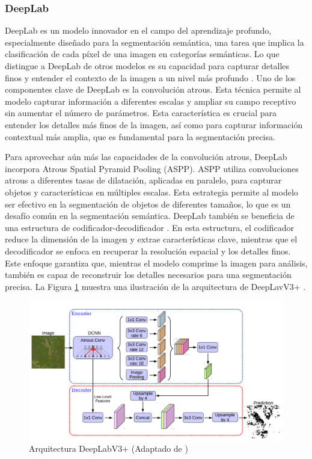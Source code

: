 \subsubsection{DeepLab}

DeepLab es un modelo innovador en el campo del aprendizaje profundo, especialmente diseñado para la segmentación semántica, una tarea que implica la clasificación de cada píxel de una imagen en categorías semánticas. Lo que distingue a DeepLab de otros modelos es su capacidad para capturar detalles finos y entender el contexto de la imagen a un nivel más profundo \cite{chen2016}. Uno de los componentes clave de DeepLab \cite{chen2017} es la convolución atrous. Esta técnica permite al modelo capturar información a diferentes escalas y ampliar su campo receptivo sin aumentar el número de parámetros.  Esta característica es crucial para entender los detalles más finos de la imagen, así como
para capturar información contextual más amplia, que es fundamental para la segmentación precisa.

Para aprovechar aún más las capacidades de la convolución atrous, DeepLab incorpora Atrous Spatial Pyramid Pooling (ASPP). ASPP utiliza convoluciones atrous a diferentes tasas de dilatación, aplicadas en paralelo, para capturar objetos y características en múltiples escalas. Esta estrategia permite al modelo ser efectivo en la segmentación de objetos de diferentes tamaños, lo que es un desafío común en la segmentación semántica.  DeepLab también se beneficia de una estructura de codificador-decodificador \cite{chen2016}. En esta estructura, el codificador reduce la dimensión de la imagen y extrae características clave, mientras que el decodificador se enfoca en recuperar la resolución espacial y los detalles finos. Este enfoque garantiza que, mientras el modelo comprime la imagen para análisis, también es capaz de reconstruir los detalles necesarios para una segmentación precisa. La Figura \ref{fig:model} muestra una ilustración de la arquitectura de DeepLavV3+ \cite{chen2018}.

\begin{figure}[t]
 \centering
 \includegraphics[width=\columnwidth]{model}
 \caption{Arquitectura DeepLabV3+ (Adaptado de \cite{chen2018})}
 \label{fig:model}
\end{figure}

